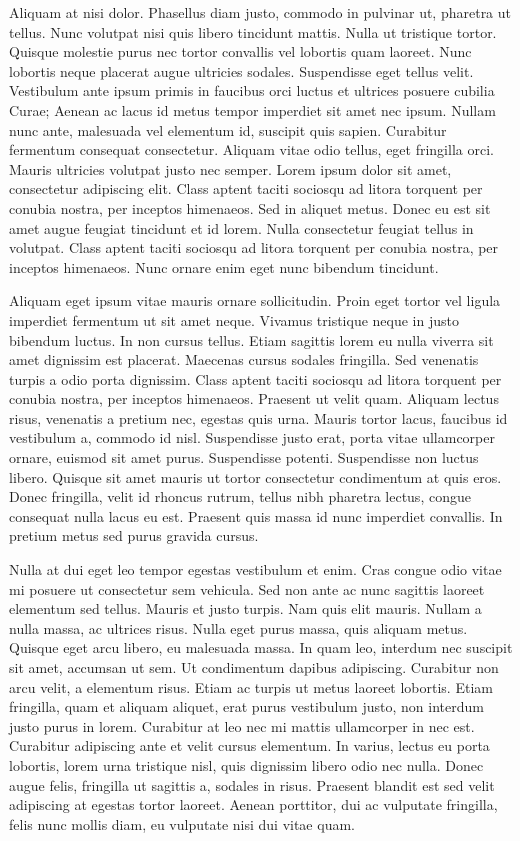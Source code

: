 Aliquam at nisi dolor.
Phasellus diam justo, commodo in pulvinar ut, pharetra ut tellus.
Nunc volutpat nisi quis libero tincidunt mattis.
Nulla ut tristique tortor.
Quisque molestie purus nec tortor convallis vel lobortis quam laoreet.
Nunc lobortis neque placerat augue ultricies sodales.
Suspendisse eget tellus velit.
Vestibulum ante ipsum primis in faucibus orci luctus et ultrices posuere cubilia Curae; Aenean ac lacus id metus tempor imperdiet sit amet nec ipsum.
Nullam nunc ante, malesuada vel elementum id, suscipit quis sapien.
Curabitur fermentum consequat consectetur.
Aliquam vitae odio tellus, eget fringilla orci.
Mauris ultricies volutpat justo nec semper.
Lorem ipsum dolor sit amet, consectetur adipiscing elit.
Class aptent taciti sociosqu ad litora torquent per conubia nostra, per inceptos himenaeos.
Sed in aliquet metus.
Donec eu est sit amet augue feugiat tincidunt et id lorem.
Nulla consectetur feugiat tellus in volutpat.
Class aptent taciti sociosqu ad litora torquent per conubia nostra, per inceptos himenaeos.
Nunc ornare enim eget nunc bibendum tincidunt.

Aliquam eget ipsum vitae mauris ornare sollicitudin.
Proin eget tortor vel ligula imperdiet fermentum ut sit amet neque.
Vivamus tristique neque in justo bibendum luctus.
In non cursus tellus.
Etiam sagittis lorem eu nulla viverra sit amet dignissim est placerat.
Maecenas cursus sodales fringilla.
Sed venenatis turpis a odio porta dignissim.
Class aptent taciti sociosqu ad litora torquent per conubia nostra, per inceptos himenaeos.
Praesent ut velit quam.
Aliquam lectus risus, venenatis a pretium nec, egestas quis urna.
Mauris tortor lacus, faucibus id vestibulum a, commodo id nisl.
Suspendisse justo erat, porta vitae ullamcorper ornare, euismod sit amet purus.
Suspendisse potenti.
Suspendisse non luctus libero.
Quisque sit amet mauris ut tortor consectetur condimentum at quis eros.
Donec fringilla, velit id rhoncus rutrum, tellus nibh pharetra lectus, congue consequat nulla lacus eu est.
Praesent quis massa id nunc imperdiet convallis.
In pretium metus sed purus gravida cursus.

Nulla at dui eget leo tempor egestas vestibulum et enim.
Cras congue odio vitae mi posuere ut consectetur sem vehicula.
Sed non ante ac nunc sagittis laoreet elementum sed tellus.
Mauris et justo turpis.
Nam quis elit mauris.
Nullam a nulla massa, ac ultrices risus.
Nulla eget purus massa, quis aliquam metus.
Quisque eget arcu libero, eu malesuada massa.
In quam leo, interdum nec suscipit sit amet, accumsan ut sem.
Ut condimentum dapibus adipiscing.
Curabitur non arcu velit, a elementum risus.
Etiam ac turpis ut metus laoreet lobortis.
Etiam fringilla, quam et aliquam aliquet, erat purus vestibulum justo, non interdum justo purus in lorem.
Curabitur at leo nec mi mattis ullamcorper in nec est.
Curabitur adipiscing ante et velit cursus elementum.
In varius, lectus eu porta lobortis, lorem urna tristique nisl, quis dignissim libero odio nec nulla.
Donec augue felis, fringilla ut sagittis a, sodales in risus.
Praesent blandit est sed velit adipiscing at egestas tortor laoreet.
Aenean porttitor, dui ac vulputate fringilla, felis nunc mollis diam, eu vulputate nisi dui vitae quam.


